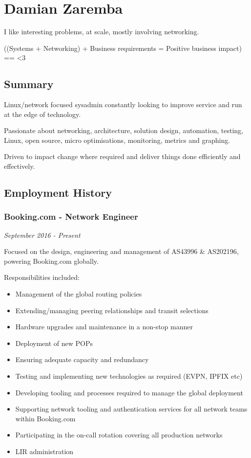 \section{Damian Zaremba}\label{damian-zaremba}

I like interesting problems, at scale, mostly involving networking.

((Systems + Networking) + Business requirements = Positive business
impact) == \textless{}3

\subsection{Summary}\label{summary}

Linux/network focused sysadmin constantly looking to improve service and
run at the edge of technology.

Passionate about networking, architecture, solution design, automation,
testing, Linux, open source, micro optimisations, monitoring, metrics
and graphing.

Driven to impact change where required and deliver things done
efficiently and effectively.

\subsection{Employment History}\label{employment-history}

\subsubsection{Booking.com - Network
Engineer}\label{booking.com---network-engineer}

\emph{September 2016 - Present}

Focused on the design, engineering and management of AS43996 \&
AS202196, powering Booking.com globally.

Responsibilities included:

\begin{itemize}
\itemsep1pt\parskip0pt
\item
  Management of the global routing policies
\item
  Extending/managing peering relationships and transit selections
\item
  Hardware upgrades and maintenance in a non-stop manner
\item
  Deployment of new POPs
\item
  Ensuring adequate capacity and redundancy
\item
  Testing and implementing new technologies as required (EVPN, IPFIX
  etc)
\item
  Developing tooling and processes required to manage the global
  deployment
\item
  Supporting network tooling and authentication services for all network
  teams within Booking.com
\item
  Participating in the on-call rotation covering all production networks
\item
  LIR administration
\end{itemize}

